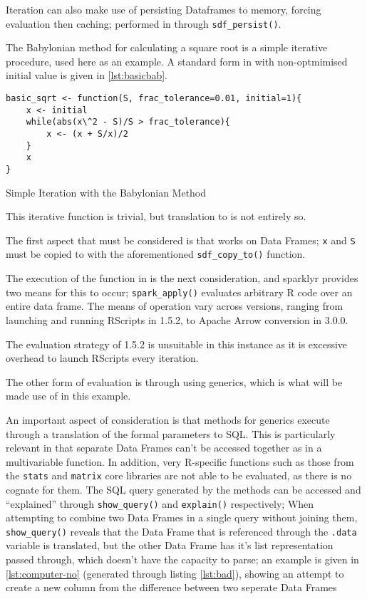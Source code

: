 Iteration can also make use of persisting  Dataframes to memory,
forcing evaluation then caching; performed in  through
\texttt{sdf_persist()}.

The Babylonian method for calculating a square root is a simple
iterative procedure, used here as an example. A standard form in \R with
non-optmimised initial value is given in \cref{lst:basicbab}.

\begin{listing}
	\begin{verbatim}
basic_sqrt <- function(S, frac_tolerance=0.01, initial=1){
	x <- initial
	while(abs(x\^2 - S)/S > frac_tolerance){
		x <- (x + S/x)/2
	}
	x
}
\end{verbatim}
	\caption{Simple Iteration with the Babylonian Method}
	\label{lst:basicbab}
\end{listing}


This iterative function is trivial, but translation to  is not
entirely so.

The first aspect that must be considered is that  works on 
Data Frames; \texttt{x} and \texttt{S} must be copied to  with the
aforementioned \texttt{sdf_copy_to()}
function.

The execution of the function in  is the next consideration, and
sparklyr provides two means for this to occur;
\texttt{spark_apply()} evaluates arbitrary R
code over an entire data frame. The means of operation vary across 
versions, ranging from launching and running RScripts in  1.5.2, to
Apache Arrow conversion in  3.0.0.

The evaluation strategy of 1.5.2 is unsuitable in this instance as it is
excessive overhead to launch RScripts every iteration.

The other form of evaluation is through using  generics, which is
what will be made use of in this example.

An important aspect of consideration is that  methods for 
generics execute through a translation of the formal parameters to 
SQL. This is particularly relevant in that separate  Data Frames
can't be accessed together as in a multivariable function. In addition,
very R-specific functions such as those from the \texttt{stats} and
\texttt{matrix} core libraries are not able to be evaluated, as there is
no  cognate for them. The SQL query generated by the methods
can be accessed and ``explained'' through
\texttt{show_query()} and
\texttt{explain()} respectively; When attempting
to combine two  Data Frames in a single query without joining them,
\texttt{show_query()} reveals that the Data
Frame that is referenced through the \texttt{.data} variable is
translated, but the other Data Frame has it's list representation passed
through, which  doesn't have the capacity to parse; an example
is given in \cref{lst:computer-no} (generated through listing
\cref{lst:bad}), showing an attempt to create a new column from the
difference between two seperate Data Frames

